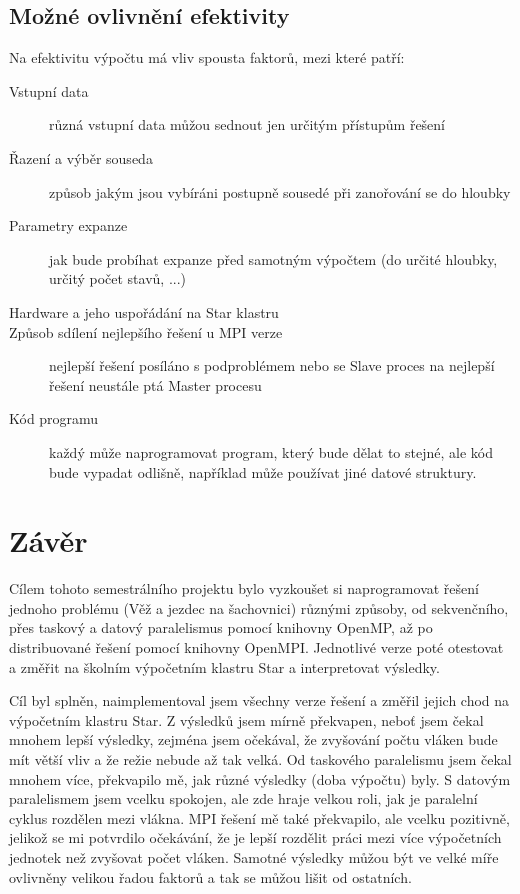 \documentclass[a4paper,10pt]{article}
\begin{document}
\pagebreak

\subsection*{Možné ovlivnění efektivity}
Na efektivitu výpočtu má vliv spousta faktorů, mezi které patří:

\begin{description}
  \item [Vstupní data] různá vstupní data můžou sednout jen určitým přístupům řešení
  \item [Řazení a výběr souseda] způsob jakým jsou vybíráni postupně sousedé při zanořování se do hloubky
  \item [Parametry expanze] jak bude probíhat expanze před samotným výpočtem (do určité hloubky, určitý počet stavů, ...)
  \item [Hardware a jeho uspořádání na Star klastru]
  \item [Způsob sdílení nejlepšího řešení u MPI verze] nejlepší řešení posíláno s podproblémem nebo se Slave proces na nejlepší řešení neustále ptá Master procesu
  \item [Kód programu] každý může naprogramovat program, který bude dělat to stejné, ale kód bude vypadat odlišně, například může používat jiné datové struktury.
\end{description}

\section{Závěr}

Cílem tohoto semestrálního projektu bylo vyzkoušet si naprogramovat řešení jednoho problému (Věž a jezdec na šachovnici) různými způsoby, od sekvenčního, přes taskový a datový paralelismus pomocí knihovny OpenMP, až po distribuované řešení pomocí knihovny OpenMPI. Jednotlivé verze poté otestovat a změřit na školním výpočetním klastru Star a interpretovat výsledky.

Cíl byl splněn, naimplementoval jsem všechny verze řešení a změřil jejich chod na výpočetním klastru Star. Z výsledků jsem mírně překvapen, neboť jsem čekal mnohem lepší výsledky, zejména jsem očekával, že zvyšování počtu vláken bude mít větší vliv a že režie nebude až tak velká. Od taskového paralelismu jsem čekal mnohem více, překvapilo mě, jak různé výsledky (doba výpočtu) byly. S datovým paralelismem jsem vcelku spokojen, ale zde hraje velkou roli, jak je paralelní cyklus rozdělen mezi vlákna. MPI řešení mě také překvapilo, ale vcelku pozitivně, jelikož se mi potvrdilo očekávání, že je lepší rozdělit práci mezi více výpočetních jednotek než zvyšovat počet vláken. Samotné výsledky můžou být ve velké míře ovlivněny velikou řadou faktorů a tak se můžou lišit od ostatních.
\end{document}
